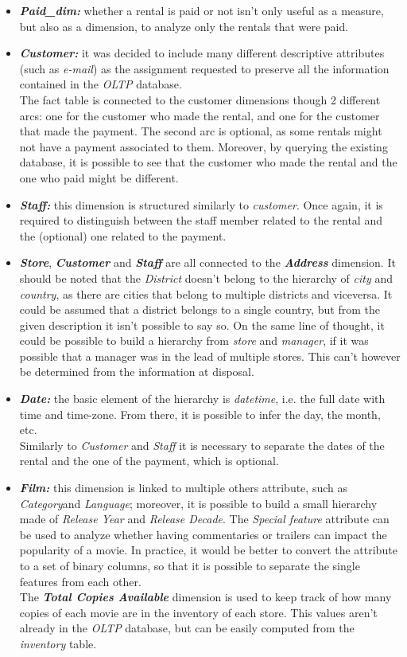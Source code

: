 \documentclass[
10pt,
a4paper,
oneside,
headinclude,
footinclude]{article}
\begin{document}
\begin{itemize}
    \item \textbf{\textit{Paid\_dim:}} whether a rental is paid or not isn't only useful as a measure, but also as a dimension, to analyze only the rentals that were paid.
    \item \textbf{\textit{Customer:}} it was decided to include many different descriptive attributes (such as \textit{e-mail}) as the assignment requested to preserve all the information contained in the \textit{OLTP} database.\\
        The fact table is connected to the customer dimensions though 2 different arcs: one for the customer who made the rental, and one for the customer that made the payment. The second arc is optional, as some rentals might not have a payment associated to them. Moreover, by querying the existing database, it is possible to see that the customer who made the rental and the one who paid might be different.
    \item \textbf{\textit{Staff:}} this dimension is structured similarly to \textit{customer}. Once again, it is required to distinguish between the staff member related to the rental and the (optional) one related to the payment.
    \item \textbf{\textit{Store}}, \textbf{\textit{Customer}} and \textbf{\textit{Staff}} are all connected to the \textbf{\textit{Address}} dimension.
        It should be noted that the \textit{District} doesn't belong to the hierarchy of \textit{city} and \textit{country}, as there are cities that belong to multiple districts and viceversa. It could be assumed that a district belongs to a single country, but from the given description it isn't possible to say so.
        On the same line of thought, it could be possible to build a hierarchy from \textit{store} and \textit{manager}, if it was possible that a manager was in the lead of multiple stores. This can't however be determined from the information at disposal.
     \item \textbf{\textit{Date:}} the basic element of the hierarchy is \textit{datetime}, i.e. the full date with time and time-zone. From there, it is possible to infer the day, the month, etc.\\
         Similarly to \textit{Customer} and \textit{Staff} it is necessary to separate the dates of the rental and the one of the payment, which is optional. 
     \item \textbf{\textit{Film:}} this dimension is linked to multiple others attribute, such as \textit{Category}and \textit{Language}; moreover, it is possible to build a small hierarchy made of \textit{Release Year} and \textit{Release Decade}. The \textit{Special feature} attribute can be used to analyze whether having commentaries or trailers can impact the popularity of a movie. In practice, it would be better to convert the attribute to a set of binary columns, so that it is possible to separate the single features from each other. \\
         The \textbf{\textit{Total Copies Available}} dimension is used to keep track of how many copies of each movie are in the inventory of each store. This values aren't already in the \textit{OLTP} database, but can be easily computed from the \textit{inventory} table.
\end{itemize}
\end{document}
